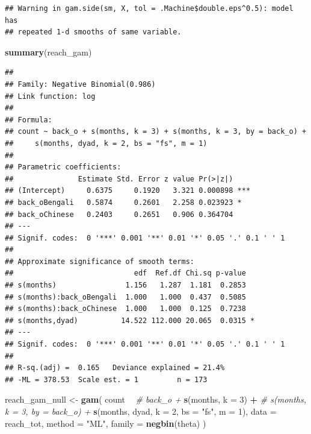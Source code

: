 \documentclass[]{article}
\newenvironment{Shaded}{\begin{snugshade}}{\end{snugshade}}
\newcommand{\CommentTok}[1]{\textcolor[rgb]{0.56,0.35,0.01}{\textit{#1}}}
\newcommand{\DataTypeTok}[1]{\textcolor[rgb]{0.13,0.29,0.53}{#1}}
\newcommand{\DecValTok}[1]{\textcolor[rgb]{0.00,0.00,0.81}{#1}}
\newcommand{\KeywordTok}[1]{\textcolor[rgb]{0.13,0.29,0.53}{\textbf{#1}}}
\newcommand{\NormalTok}[1]{#1}
\newcommand{\OperatorTok}[1]{\textcolor[rgb]{0.81,0.36,0.00}{\textbf{#1}}}
\newcommand{\StringTok}[1]{\textcolor[rgb]{0.31,0.60,0.02}{#1}}
\begin{document}
\begin{verbatim}
## Warning in gam.side(sm, X, tol = .Machine$double.eps^0.5): model has
## repeated 1-d smooths of same variable.
\end{verbatim}

\begin{Shaded}
\begin{Highlighting}[]
\KeywordTok{summary}\NormalTok{(reach_gam)}
\end{Highlighting}
\end{Shaded}

\begin{verbatim}
## 
## Family: Negative Binomial(0.986) 
## Link function: log 
## 
## Formula:
## count ~ back_o + s(months, k = 3) + s(months, k = 3, by = back_o) + 
##     s(months, dyad, k = 2, bs = "fs", m = 1)
## 
## Parametric coefficients:
##               Estimate Std. Error z value Pr(>|z|)    
## (Intercept)     0.6375     0.1920   3.321 0.000898 ***
## back_oBengali   0.5874     0.2601   2.258 0.023923 *  
## back_oChinese   0.2403     0.2651   0.906 0.364704    
## ---
## Signif. codes:  0 '***' 0.001 '**' 0.01 '*' 0.05 '.' 0.1 ' ' 1
## 
## Approximate significance of smooth terms:
##                            edf  Ref.df Chi.sq p-value  
## s(months)                1.156   1.287  1.181  0.2853  
## s(months):back_oBengali  1.000   1.000  0.437  0.5085  
## s(months):back_oChinese  1.000   1.000  0.125  0.7238  
## s(months,dyad)          14.522 112.000 20.065  0.0315 *
## ---
## Signif. codes:  0 '***' 0.001 '**' 0.01 '*' 0.05 '.' 0.1 ' ' 1
## 
## R-sq.(adj) =  0.165   Deviance explained = 21.4%
## -ML = 378.53  Scale est. = 1         n = 173
\end{verbatim}

\begin{Shaded}
\begin{Highlighting}[]
\NormalTok{reach_gam_null <-}\StringTok{ }\KeywordTok{gam}\NormalTok{(}
\NormalTok{  count }\OperatorTok{~}
\StringTok{    }\CommentTok{# back_o +}
\StringTok{    }\KeywordTok{s}\NormalTok{(months, }\DataTypeTok{k =} \DecValTok{3}\NormalTok{) }\OperatorTok{+}
\StringTok{    }\CommentTok{# s(months, k = 3, by = back_o) +}
\StringTok{    }\KeywordTok{s}\NormalTok{(months, dyad, }\DataTypeTok{k =} \DecValTok{2}\NormalTok{, }\DataTypeTok{bs =} \StringTok{"fs"}\NormalTok{, }\DataTypeTok{m =} \DecValTok{1}\NormalTok{),}
  \DataTypeTok{data =}\NormalTok{ reach_tot,}
  \DataTypeTok{method =} \StringTok{"ML"}\NormalTok{,}
  \DataTypeTok{family =} \KeywordTok{negbin}\NormalTok{(theta)}
\NormalTok{)}
\end{Highlighting}
\end{Shaded}
\end{document}
